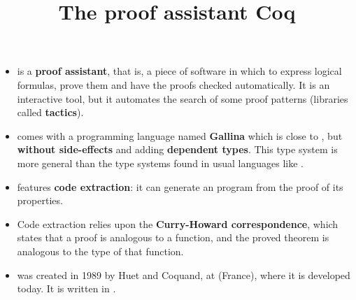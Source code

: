 \documentclass[wide]{slides}
\begin{document}
\begin{slide}
  \title{The proof assistant Coq}

  \begin{itemize}

    \item \Coq is a \textbf{proof assistant}, that is, a piece of
      software in which to express logical formulas, prove them and
      have the proofs checked automatically. It is an interactive
      tool, but it automates the search of some proof patterns
      (libraries called \textbf{tactics}).

    \item \Coq comes with a programming language named
      \textbf{Gallina} which is close to \OCaml, but \textbf{without
        side\hyp{}effects} and adding \textbf{dependent types}. This
      type system is more general than the type systems found in usual
      languages like \Java.

    \item \Coq features \textbf{code extraction}: it can generate an
      \OCaml program from the proof of its properties.


    \item Code extraction relies upon the \textbf{Curry\hyp{}Howard
      correspondence}, which states that a proof is analogous to a
      function, and the proved theorem is analogous to the type of
      that function.

    \item \Coq was created in 1989 by Huet and Coquand, at \Inria
      (France), where it is developed today. It is written in \OCaml.

  \end{itemize}

\end{slide}
\end{document}
